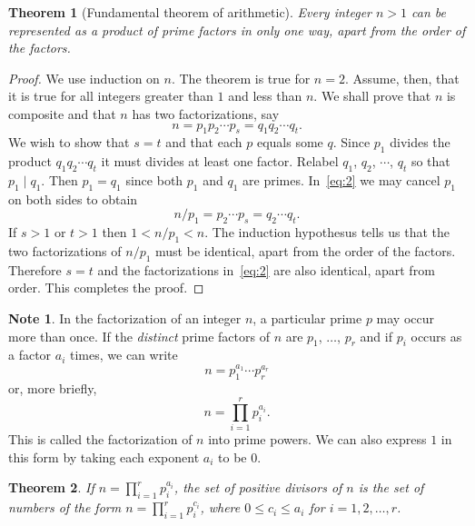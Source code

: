 \documentclass[11pt]{article}
\newtheorem{theorem}{Theorem}
\theoremstyle{definition}
\newtheorem*{note}{Note}
\begin{document}
\begin{theorem}[Fundamental theorem of arithmetic]
  Every integer \(n > 1\) can be represented as a product of prime factors in only one way, apart from the
  order of the factors.
\end{theorem}

\begin{proof}
  We use induction on \(n\). The theorem is true for \(n = 2\). Assume, then, that it is true for all
  integers greater than \(1\) and less than \(n\). We shall prove that \(n\) is composite and that \(n\) has
  two factorizations, say
  \begin{equation}
    \label{eq:2}
    n = p_{1}p_{2}\cdots p_{s} = q_{1}q_{2} \cdots q_{t}.
  \end{equation}
  We wish to show that \(s = t\) and that each \(p\) equals some \(q\). Since \(p_{1}\) divides the product
  \(q_{1}q_{2}\cdots q_{t}\) it must divides at least one factor. Relabel \(q_{1}\), \(q_{2}\), \(\cdots\), \(q_{t}\)
  so that \(p_{1} \mid q_{1}\). Then \(p_{1} = q_{1}\) since both \(p_{1}\) and \(q_{1}\) are primes. In~\ref{eq:2} we may
  cancel \(p_{1}\) on both sides to obtain
  \begin{equation*}
    n/p_{1} =  p_{2}\cdots p_{s} = q_{2} \cdots q_{t}.
  \end{equation*}
  If \(s > 1\) or \(t > 1\) then \(1 < n/p_{1} < n\). The induction hypothesus tells us that
  the two factorizations of \(n/p_{1}\) must be identical, apart from the order of the factors.
  Therefore \(s = t\) and the factorizations in~\ref{eq:2} are also identical, apart from order.
  This completes the proof.
\end{proof}

\begin{note}
  In the factorization of an integer \(n\), a particular prime \(p\) may occur more than once. If the \emph{distinct}
  prime factors of \(n\) are \(p_{1}\), \(\ldots\), \(p_{r}\) and if \(p_{i}\) occurs as a factor \(a_{i}\) times, we can write
  \begin{equation*}
    n = p_{1}^{a_{1}}\cdots p_{r}^{a_{r}}
  \end{equation*}
  or, more briefly,
  \begin{equation*}
    n = \prod_{i=1}^{r}p_{i}^{a_{i}}.
  \end{equation*}
  This is called the factorization of \(n\) into prime powers. We can also express \(1\)
  in this form by taking each exponent \(a_{i}\) to be \(0\).
\end{note}

\begin{theorem}
  If \(n = \prod_{i=1}^{r}p_{i}^{a_{i}}\), the set of positive divisors of \(n\) is the set of numbers of the form
  \(n = \prod_{i=1}^{r}p_{i}^{c_{i}}\), where \(0 \leq c_{i} \leq a_{i}\) for \(i = 1, 2, \ldots, r\).
\end{theorem}
\end{document}
